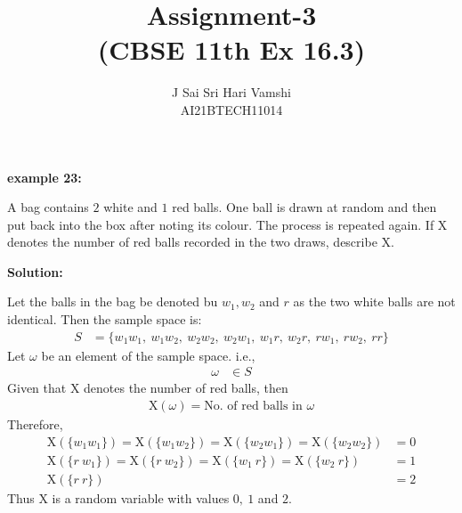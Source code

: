 \documentclass[journal,12pt,twocolumn]{article}\usepackage[margin=1.25 in]{geometry}
\title{\LARGE{\textbf{Assignment-3}\\(CBSE 11th Ex 16.3)}}
\author{\normalsize J Sai Sri Hari Vamshi\\ \footnotesize AI21BTECH11014}
\date{}
\providecommand{\x}[1]{\ensuremath{\text{X}\left(#1\right)}}
\begin{document}
\maketitle
\begin{center}
    \textbf{\large example 23:}
\end{center}

\noindent A bag contains $2$ white and $1$ red balls. One ball is drawn at random and then put back into the box after noting its colour. The process is repeated again. If X denotes the number of red balls recorded in the two draws, describe X.

\begin{center}
    \textbf{\large Solution:}
\end{center}

\noindent Let the balls in the bag be denoted bu $w_1, w_2$ and $r$ as the two white balls are not identical.
\noindent Then the sample space is:
	\begin{align*}
	S & = \{w_1 w_1,\ w_1 w_2,\ w_2 w_2,\ w_2 w_1,\ w_1 r,\ w_2 r,\ r w_1,\ r 	w_2,\ r r\}
	\end{align*}
\noindent Let $\omega$ be an element of the sample space. i.e.,
	\begin{align*}
	\omega & \in S
	\end{align*}
\noindent Given that X denotes the number of red balls, then 
	\begin{align*}
	\x{\omega} = \text{No. of red balls in }\omega
	\end{align*}
\noindent Therefore,
	\begin{align*}
	\x{\{w_1 w_1\}} = \x{\{w_1 w_2\}} = \x{\{w_2 w_1\}} = \x{\{w_2 w_2\}} & = 0\\
	\x{\{r\ w_1\}} = \x{\{r\ w_2\}} = \x{\{w_1\ r\}} = \x{\{w_2\ r\}} & = 1\\
	\x{\{r\ r\}} & = 2
	\end{align*}
\noindent Thus X is a random variable with values $0,\ 1$ and $2$.
\end{document}

